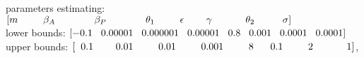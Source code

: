 \documentclass[12pt]{article}
\begin{document}
parameters estimating: $[m \hspace{0.9cm}   \beta_A \hspace{1.4cm}   \beta_P \hspace{1.4cm} \theta_1 \hspace{0.9cm}  \epsilon \hspace{0.8cm} \gamma \hspace{1.2cm}  \theta_2 \hspace{1cm}   \sigma ]$ \\
lower bounds:  \hspace{1.2cm} $[-0.1 \hspace{0.3cm}  0.00001 \hspace{0.3cm}    0.000001 \hspace{0.3cm}      0.00001  \hspace{0.3cm}        0.8 \hspace{0.3cm}     0.001 \hspace{0.3cm}     0.0001 \hspace{0.3cm}    0.0001 ]$ \\
upper bounds:\hspace{1.3cm} $[\hspace{0.2cm}0.1 \hspace{0.8cm}     0.01  \hspace{0.9cm}        0.01  \hspace{0.9cm}        0.001  \hspace{0.9cm}           8 \hspace{0.6cm}        0.1  \hspace{0.9cm}            2    \hspace{1.2cm}    1     ]$,
\end{document}
